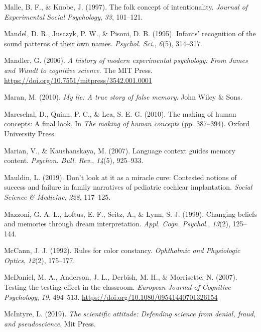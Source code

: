 \documentclass[
]{krantz}
\newlength{\cslhangindent}
\newenvironment{CSLReferences}[2] %
 {\begin{list}{}{%
  \setlength{\itemindent}{0pt}
  \setlength{\leftmargin}{0pt}
  \setlength{\parsep}{0pt}
  \ifodd #1
   \setlength{\leftmargin}{\cslhangindent}
   \setlength{\itemindent}{-1\cslhangindent}
  \fi
  \setlength{\itemsep}{#2\baselineskip}}}
 {\end{list}}
\begin{document}
\begin{CSLReferences}{1}{0}
Malle, B. F., \& Knobe, J. (1997). The folk concept of intentionality. \emph{Journal of Experimental Social Psychology}, \emph{33}, 101--121.

Mandel, D. R., Jusczyk, P. W., \& Pisoni, D. B. (1995). Infants' recognition of the sound patterns of their own names. \emph{Psychol. Sci.}, \emph{6}(5), 314--317.

Mandler, G. (2006). \emph{A history of modern experimental psychology: {From James} and {Wundt} to cognitive science}. The MIT Press. \url{https://doi.org/10.7551/mitpress/3542.001.0001}

Maran, M. (2010). \emph{My lie: A true story of false memory}. John Wiley \& Sons.

Mareschal, D., Quinn, P. C., \& Lea, S. E. G. (2010). The making of human concepts: A final look. In \emph{The making of human concepts} (pp. 387--394). Oxford University Press.

Marian, V., \& Kaushanskaya, M. (2007). Language context guides memory content. \emph{Psychon. Bull. Rev.}, \emph{14}(5), 925--933.

Mauldin, L. (2019). Don't look at it as a miracle cure: Contested notions of success and failure in family narratives of pediatric cochlear implantation. \emph{Social Science \& Medicine}, \emph{228}, 117--125.

Mazzoni, G. A. L., Loftus, E. F., Seitz, A., \& Lynn, S. J. (1999). Changing beliefs and memories through dream interpretation. \emph{Appl. Cogn. Psychol.}, \emph{13}(2), 125--144.

McCann, J. J. (1992). Rules for color constancy. \emph{Ophthalmic and Physiologic Optics}, \emph{12}(2), 175--177.

McDaniel, M. A., Anderson, J. L., Derbish, M. H., \& Morrisette, N. (2007). Testing the testing effect in the classroom. \emph{European Journal of Cognitive Psychology}, \emph{19}, 494--513. \url{https://doi.org/10.1080/09541440701326154}

McIntyre, L. (2019). \emph{The scientific attitude: Defending science from denial, fraud, and pseudoscience}. Mit Press.


\end{CSLReferences}
\end{document}
